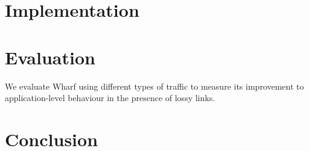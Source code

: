 \documentclass[sigconf]{acmart}
\newcommand{\OurSys}{Wharf\xspace}
\begin{document}
\section{Implementation}
\label{sec:implementation}
\section{Evaluation}
We evaluate \OurSys using different types of traffic to measure its improvement
to application-level behaviour in the presence of lossy links.


\section{Conclusion}



\end{document}
